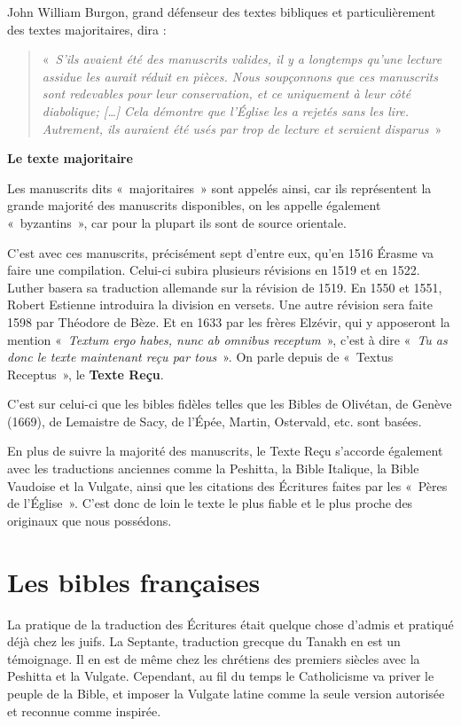 \begin{small}
John William Burgon, grand défenseur des textes bibliques et particulièrement des textes majoritaires, dira :
\begin{quote}
«~\emph{S’ils avaient été des manuscrits valides, il y a longtemps qu’une lecture assidue les aurait réduit en pièces. Nous soupçonnons que ces manuscrits sont redevables pour leur conservation, et ce uniquement à leur côté diabolique; […] Cela démontre que l’Église les a rejetés sans les lire. Autrement, ils auraient été usés par trop de lecture et seraient disparus}~»\newline
\end{quote}

\textbf{Le texte majoritaire}\bigskip

Les manuscrits dits «~majoritaires~» sont appelés ainsi, car ils représentent la grande majorité des manuscrits disponibles, on les appelle également «~byzantins~», car pour la plupart ils sont de source orientale.\bigskip

C'est avec ces manuscrits, précisément sept d'entre eux, qu'en 1516 Érasme va faire une compilation. Celui-ci subira plusieurs révisions en 1519 et en 1522. Luther basera sa traduction allemande sur la révision de 1519. En 1550 et 1551, Robert Estienne introduira la division en versets. Une autre révision sera faite 1598 par Théodore de Bèze. Et en 1633 par les frères Elzévir, qui y apposeront la mention «~\emph{Textum ergo habes, nunc ab omnibus receptum}~», c'est à dire «~\emph{Tu as donc le texte maintenant reçu par tous}~». On parle depuis de «~Textus Receptus~», le \textbf{Texte Reçu}.\bigskip

C'est sur celui-ci que les bibles fidèles telles que les Bibles de Olivétan, de Genève (1669), de Lemaistre de Sacy, de l'Épée, Martin, Ostervald, etc. sont basées.\bigskip

En plus de suivre la majorité des manuscrits, le Texte Reçu s'accorde également avec les traductions anciennes comme la Peshitta, la Bible Italique, la Bible Vaudoise et la Vulgate, ainsi que les citations des Écritures faites par les «~Pères de l'Église~». C'est donc de loin le texte le plus fiable et le plus proche des originaux que nous possédons.

\section*{Les bibles françaises}

La pratique de la traduction des Écritures était quelque chose d'admis et pratiqué déjà chez les juifs. La Septante, traduction grecque du Tanakh en est un témoignage. Il en est de même chez les chrétiens des premiers siècles avec la Peshitta et la Vulgate. Cependant, au fil du temps le Catholicisme va priver le peuple de la Bible, et imposer la Vulgate latine comme la seule version autorisée et reconnue comme inspirée.\bigskip


\end{small}

